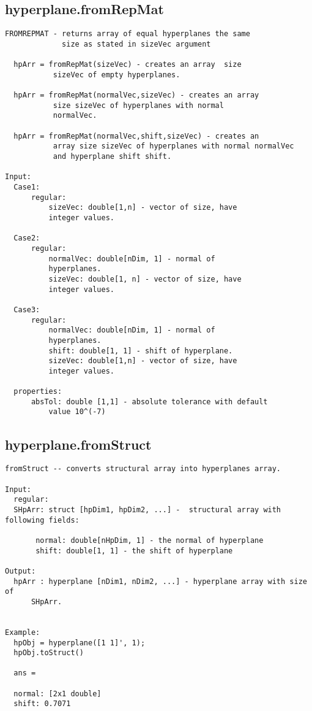 \subsection{\texorpdfstring{hyperplane.fromRepMat}{fromRepMat}}\label{method:hyperplane.fromRepMat}
\begin{verbatim}
FROMREPMAT - returns array of equal hyperplanes the same
             size as stated in sizeVec argument

  hpArr = fromRepMat(sizeVec) - creates an array  size
           sizeVec of empty hyperplanes.

  hpArr = fromRepMat(normalVec,sizeVec) - creates an array
           size sizeVec of hyperplanes with normal
           normalVec.

  hpArr = fromRepMat(normalVec,shift,sizeVec) - creates an
           array size sizeVec of hyperplanes with normal normalVec
           and hyperplane shift shift.

Input:
  Case1:
      regular:
          sizeVec: double[1,n] - vector of size, have
          integer values.

  Case2:
      regular:
          normalVec: double[nDim, 1] - normal of
          hyperplanes.
          sizeVec: double[1, n] - vector of size, have
          integer values.

  Case3:
      regular:
          normalVec: double[nDim, 1] - normal of
          hyperplanes.
          shift: double[1, 1] - shift of hyperplane.
          sizeVec: double[1,n] - vector of size, have
          integer values.

  properties:
      absTol: double [1,1] - absolute tolerance with default
          value 10^(-7)
\end{verbatim}
\subsection{\texorpdfstring{hyperplane.fromStruct}{fromStruct}}\label{method:hyperplane.fromStruct}
\begin{verbatim}
fromStruct -- converts structural array into hyperplanes array.

Input:
  regular:
  SHpArr: struct [hpDim1, hpDim2, ...] -  structural array with following fields:

       normal: double[nHpDim, 1] - the normal of hyperplane
       shift: double[1, 1] - the shift of hyperplane

Output:
  hpArr : hyperplane [nDim1, nDim2, ...] - hyperplane array with size of
      SHpArr.


Example:
  hpObj = hyperplane([1 1]', 1);
  hpObj.toStruct()

  ans =

  normal: [2x1 double]
  shift: 0.7071
\end{verbatim}
